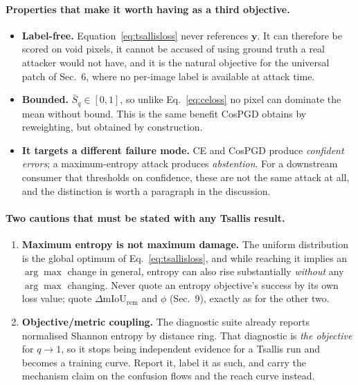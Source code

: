 \documentclass[11pt,a4paper]{article}
\begin{document}
\paragraph{Properties that make it worth having as a third objective.}
\begin{itemize}
\item \textbf{Label-free.} Equation~\eqref{eq:tsallisloss} never references
  $\mathbf{y}$. It can therefore be scored on void pixels, it cannot be
  accused of using ground truth a real attacker would not have, and it is
  the natural objective for the universal patch of Sec.~6, where no
  per-image label is available at attack time.
\item \textbf{Bounded.} $\bar S_q\in[0,1]$, so unlike Eq.~\eqref{eq:celoss}
  no pixel can dominate the mean without bound. This is the same benefit
  CosPGD obtains by reweighting, but obtained by construction.
\item \textbf{It targets a different failure mode.} CE and CosPGD produce
  \emph{confident errors}; a maximum-entropy attack produces
  \emph{abstention}. For a downstream consumer that thresholds on
  confidence, these are not the same attack at all, and the distinction is
  worth a paragraph in the discussion.
\end{itemize}

\paragraph{Two cautions that must be stated with any Tsallis result.}
\begin{enumerate}
\item \textbf{Maximum entropy is not maximum damage.} The uniform
  distribution is the global optimum of Eq.~\eqref{eq:tsallisloss}, and
  while reaching it implies an $\arg\max$ change in general, entropy can
  also rise substantially \emph{without} any $\arg\max$ changing. Never
  quote an entropy objective's success by its own loss value; quote
  $\Delta\mathrm{mIoU}_{\mathrm{rem}}$ and $\phi$ (Sec.~9), exactly as for
  the other two.
\item \textbf{Objective/metric coupling.} The diagnostic suite already
  reports normalised Shannon entropy by distance ring. That diagnostic is
  \emph{the objective} for $q\to1$, so it stops being independent evidence
  for a Tsallis run and becomes a training curve. Report it, label it as
  such, and carry the mechanism claim on the confusion flows and the reach
  curve instead.
\end{enumerate}
\end{document}
